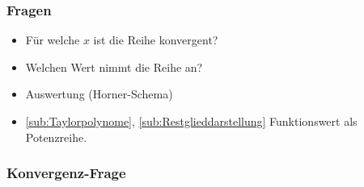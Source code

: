 \subsubsection*{Fragen}

\begin{itemize}
   \item Für welche $x$ ist die Reihe konvergent?
   \item Welchen Wert nimmt die Reihe an?
   \item Auswertung \checkmark (Horner-Schema)
   \item \ref{sub:Taylorpolynome}, \ref{sub:Restglieddarstellung} Funktionswert als Potenzreihe.
\end{itemize}

\subsubsection*{Konvergenz-Frage}

